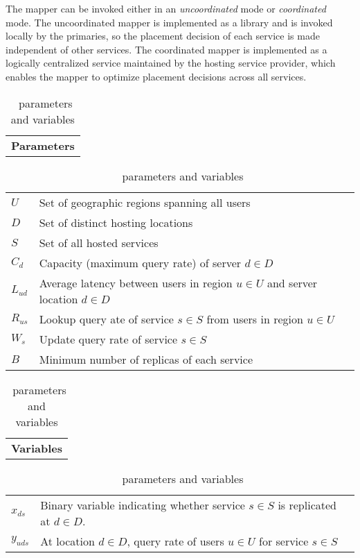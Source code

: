 The mapper can be invoked either in an {\em uncoordinated} mode or {\em coordinated} mode. The uncoordinated mapper is implemented as a library and is invoked locally by the primaries, so the placement decision of each service is made independent of other services. The coordinated mapper is implemented as a logically centralized service maintained by the hosting service provider, which enables the mapper to optimize placement decisions across all services.


\begin{table}[ht]
\center
\begin{small}
\begin{tabular}{p{2.90in}}
\hline
\textbf{Parameters} \\

\end{tabular}
\begin{tabular}{p{0.25in}|p{2.5in}}
\hline
$U$ &  Set of geographic regions spanning all users \\ 
$D$ & Set of distinct hosting locations\\
$S$ & Set of all hosted services\\
$C_d$ & Capacity (maximum query rate) of server $d \in D$\\
$L_{ud} $ & Average latency between users in region $u \in U$ and server location $d \in D$\\
$R_{us}$ & Lookup query ate of service $s \in S$ from users in region $u \in U$\\ 
$W_s$ & Update query rate of service $s \in S$\\
$B$ & Minimum number of replicas of each service\\
\hline
\end{tabular}

\vspace{0.1in}
\begin{tabular}{p{2.9in}}
\hline
\textbf{Variables} \\
\end{tabular}
\begin{tabular}{p{0.25in}|p{2.5in}}
\hline
$x_{ds}$ & Binary variable indicating whether service $s\in S$ is replicated at $d \in D$.\\
$y_{uds}$ & At location $d \in D$, query rate of users $u \in U$ for service $s \in S$\\
\hline
\end{tabular}
\end{small}
\caption{\auspice\ parameters and variables}
\label{table:parameters}
\end{table}



